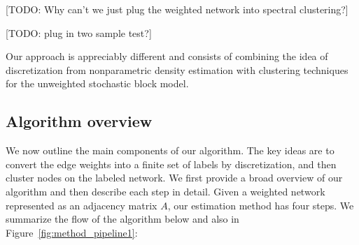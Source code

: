 \documentclass{article}
\begin{document}
[TODO: Why can't we just plug the weighted network into spectral clustering?]

[TODO: plug in two sample test?]

Our approach is appreciably different and consists of combining the idea of discretization from nonparametric density estimation with clustering techniques for the unweighted stochastic block model. 

\subsection{Algorithm overview}

We now outline the main components of our algorithm. The key ideas are to convert the edge weights into a finite set of labels by discretization, and then cluster nodes on the labeled network. We first provide a broad overview of our algorithm and then describe each step in detail. Given a weighted network represented as an adjacency matrix $A$, our estimation method has four steps. We summarize the flow of the algorithm below and also in Figure~\ref{fig:method_pipeline1}:
\end{document}
